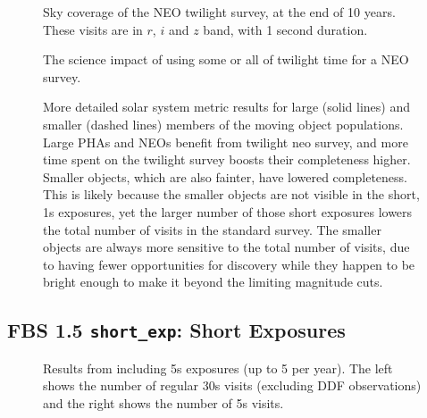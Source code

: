 \begin{figure}
\caption{Sky coverage of the NEO twilight survey, at the end of 10 years. These visits are in $r$, $i$ and $z$ band, with 1 second duration.}
\label{fig:sky_twilightneo}
\end{figure}

\begin{figure}
\caption{The science impact of using some or all of twilight time for a NEO survey.}\label{fig:neoradar}
\end{figure}

\begin{figure}
\caption{More detailed solar system metric results for large (solid lines) and smaller (dashed lines) members of the moving object populations. Large PHAs and NEOs benefit from twilight neo survey, and more time spent on the twilight survey boosts their completeness higher. Smaller objects, which are also fainter, have lowered completeness. This is likely because the smaller objects are not visible in the short, 1s exposures, yet the larger number of those short exposures lowers the total number of visits in the standard survey. The smaller objects are always more sensitive to the total number of visits, due to having fewer opportunities for discovery while they happen to be bright enough to make it beyond the limiting magnitude cuts.}
\label{fig:sscompleteness_twilight}
\end{figure}

\subsection{FBS 1.5 {\tt short\_exp}: Short Exposures}\label{ss:shortexp}

\begin{figure}
\caption{Results from including 5s exposures (up to 5 per year). The left shows the number of regular 30s visits (excluding DDF observations) and the right shows the number of 5s visits.}
\end{figure}


